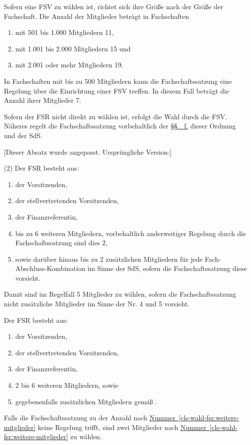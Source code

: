 \documentclass[%
draft,%
multilinesections%
]{fswo}
\newcommand\bemFe[1] {{\color{Cyan}[#1]}}
\newcommand\remark[1]{\begin{addmargin}{1cm}#1\end{addmargin}}
\newcommand\bemFe[1]{}%
\newcommand\remark[1]{}
\newcommand*{\refClauseF}[1]{\hyperref[#1]{\S\S~\refClauseN{#1}~f.}}
\newcommand*{\refItem}[1]{\hyperref[#1]{Nummer~\ref{#1}}}
\begin{document}
\begin{contract}
\label{cls-wahl-fsv}
Sofern eine FSV zu wählen ist, richtet sich ihre Größe nach der Größe der Fachschaft.
Die Anzahl der Mitglieder beträgt in Fachschaften
\begin{enumerate}
  \item mit 501 bis 1.000 Mitgliedern 11,
  \item mit 1.001 bis 2.000 Mitgliedern 15 und
  \item mit 2.001 oder mehr Mitgliedern 19.
\end{enumerate}

In Fachschaften mit bis zu 500 Mitgliedern kann die Fachschaftssatzung eine Regelung über die Einrichtung einer FSV treffen.
In diesem Fall beträgt die Anzahl ihrer Mitglieder 7.

\label{cls-wahl-fsr}
Sofern der FSR nicht direkt zu wählen ist, erfolgt die Wahl durch die FSV.
Näheres regelt die Fachschaftssatzung vorbehaltlich der \refClauseF{cls-auszaehlung-stimmen} dieser Ordnung und der SdS.

\remark{%
\bemFe{Dieser Absatz wurde angepasst. Ursprüngliche Version:} \color{Gray}

(2) Der FSR besteht aus:
\begin{enumerate}
  \item der Vorsitzenden,
  \item der stellvertretenden Vorsitzenden,
  \item der Finanzreferentin,
  \item bis zu 6 weiteren Mitgliedern, vorbehaltlich anderweitiger Regelung durch die Fachschaftssatzung sind dies 2,
  \item sowie darüber hinaus bis zu 2 zusätzlichen Mitgliedern für jede Fach-Abschluss-Kombination im Sinne der SdS, sofern die Fachschaftssatzung diese vorsieht.
\end{enumerate}
Damit sind im Regelfall 5 Mitglieder zu wählen, sofern die Fachschaftssatzung nicht zusätzliche Mitglieder im Sinne der Nr. 4 und 5 vorsieht.%
}

\begingroup\makeatletter\ifFK@draft\color{Green}\fi\makeatother
Der FSR besteht aus:
\begin{enumerate}
  \item der Vorsitzenden,
  \item der stellvertretenden Vorsitzenden,
  \item der Finanzreferentin,
  \item 2 bis 6 weiteren Mitgliedern, sowie\label{cls-wahl-fsr:weitere-mitglieder}
  \item gegebenenfalls zusätzlichen Mitgliedern gemäß .
\end{enumerate}
Falls die Fachschaftssatzung zu der Anzahl nach \refItem{cls-wahl-fsr:weitere-mitglieder} keine Regelung trifft, sind zwei Mitglieder nach \refItem{cls-wahl-fsr:weitere-mitglieder} zu wählen.
\endgroup


\end{contract}
\end{document}
